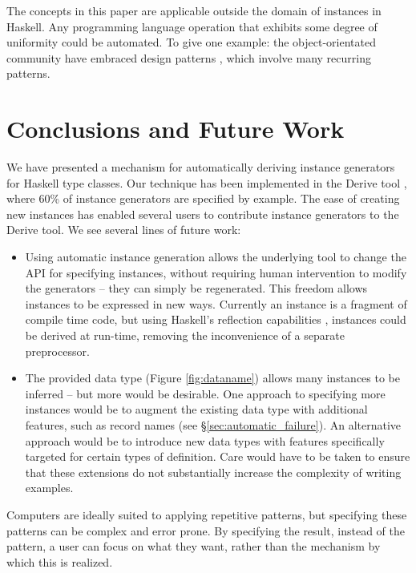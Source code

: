 \documentclass[preprint]{sigplanconf}
\begin{document}
The concepts in this paper are applicable outside the domain of instances in Haskell. Any programming language operation that exhibits some degree of uniformity could be automated. To give one example: the object-orientated community have embraced design patterns \cite{design_patterns}, which involve many recurring patterns.

\section{Conclusions and Future Work}
\label{sec:conclusion}

We have presented a mechanism for automatically deriving instance generators for Haskell type classes. Our technique has been implemented in the Derive tool \cite{derive}, where 60\% of instance generators are specified by example. The ease of creating new instances has enabled several users to contribute instance generators to the Derive tool. We see several lines of future work:

\begin{itemize}
\item Using automatic instance generation allows the underlying tool to change the API for specifying instances, without requiring human intervention to modify the generators -- they can simply be regenerated. This freedom allows instances to be expressed in new ways. Currently an instance is a fragment of compile time code, but using Haskell's reflection capabilities \cite{lammel:syb2}, instances could be derived at run-time, removing the inconvenience of a separate preprocessor.
\item The provided data type (Figure \ref{fig:dataname}) allows many instances to be inferred -- but more would be desirable. One approach to specifying more instances would be to augment the existing data type with additional features, such as record names (see \S\ref{sec:automatic_failure}). An alternative approach would be to introduce new data types with features specifically targeted for certain types of definition. Care would have to be taken to ensure that these extensions do not substantially increase the complexity of writing examples.
\end{itemize}

Computers are ideally suited to applying repetitive patterns, but specifying these patterns can be complex and error prone. By specifying the result, instead of the pattern, a user can focus on what they want, rather than the mechanism by which this is realized.





\balance



\end{document}
